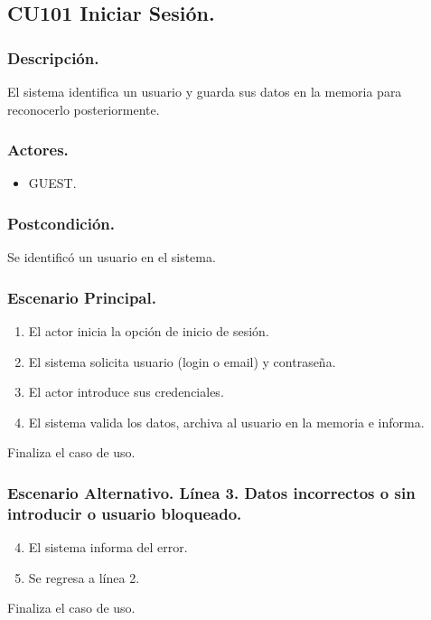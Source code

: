 \subsection{CU101 Iniciar Sesi\'{o}n.}
\subsubsection{Descripci\'{o}n.}
El sistema identifica un usuario y guarda sus datos en la memoria para reconocerlo posteriormente.
\subsubsection{Actores.}
\begin{itemize}
\item GUEST.
\end{itemize}
\subsubsection{Postcondici\'{o}n.}
Se identific\'{o} un usuario en el sistema.
\subsubsection{Escenario Principal.}
\begin{enumerate}
\item El actor inicia la opci\'{o}n de inicio de sesi\'{o}n.
\item El sistema solicita usuario (login o email) y contrase\~{n}a.
\item El actor introduce sus credenciales.
\item El sistema valida los datos, archiva al usuario en la memoria e informa.
\end{enumerate}
Finaliza el caso de uso.
\subsubsection{Escenario Alternativo. L\'{i}nea 3. Datos incorrectos o sin introducir o usuario bloqueado.}
\begin{enumerate}
\setcounter{enumi}{3}
\item El sistema informa del error.
\item Se regresa a l\'{i}nea 2.
\end{enumerate}
Finaliza el caso de uso.